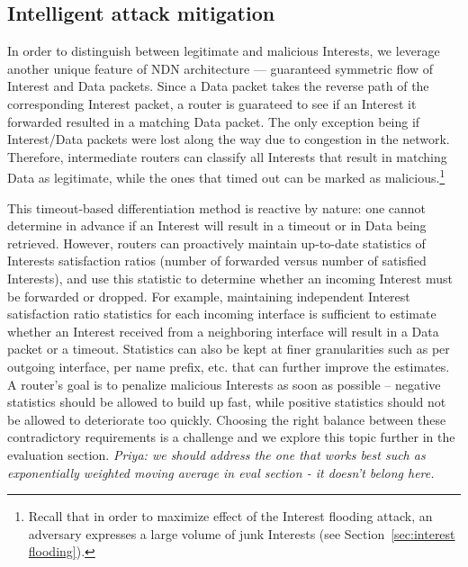 
\subsection{Intelligent attack mitigation}
\label{sec:intelligent mitigating}


In order to distinguish between legitimate and malicious Interests, we leverage another unique feature of  NDN architecture --- guaranteed symmetric flow of Interest and Data packets. Since a Data packet takes the reverse path of the corresponding Interest packet, a router is guarateed to see if an Interest it forwarded resulted in a matching Data packet. The only exception being if Interest/Data packets were lost along the way due to congestion in the network.
Therefore, intermediate routers can classify all Interests that result in matching Data as legitimate, while the ones that timed out can be marked as malicious.\footnote{Recall that in order to maximize effect of the Interest flooding attack, an adversary expresses a large volume of junk Interests (see Section~\ref{sec:interest flooding}).}  

This timeout-based differentiation method is reactive by nature: one cannot determine in advance if an Interest will result in a timeout or in Data being retrieved. However, routers can proactively maintain up-to-date statistics of Interests satisfaction ratios (number of forwarded versus number of satisfied Interests), and use this statistic to determine whether an incoming Interest must be forwarded or dropped. For example, maintaining independent Interest satisfaction ratio statistics for each incoming interface is sufficient to estimate whether an Interest received from a neighboring interface will result in a Data packet or a timeout. Statistics can also be kept at finer granularities such as per outgoing interface, per name prefix, etc. that can further improve the estimates. A router's goal is to penalize malicious Interests as soon as possible -- negative statistics should be allowed to build up fast, while positive statistics should not be allowed to deteriorate too quickly. Choosing the right balance between these contradictory requirements is a challenge and we explore this topic further  in the evaluation section.  {\it Priya: we should address the one that works best such as exponentially weighted moving average in eval section - it doesn't belong here.} 


